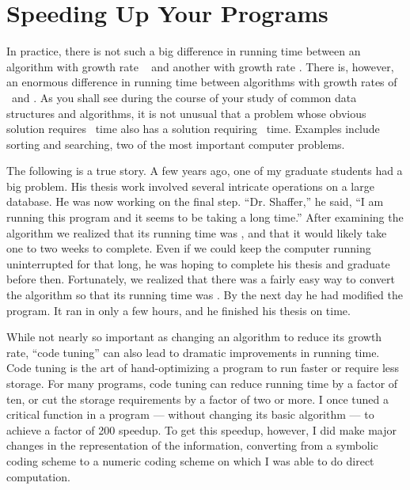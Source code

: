 \section{Speeding Up Your Programs}
\label{CodeTune}

In practice, there is not such a big difference in running time
between an algorithm with growth rate
\Thetan\  and another with
growth rate \Thetanlogn.
There is, however, an enormous difference in running time between
algorithms with growth rates of \Thetanlogn\ and \Thetantwo.
As you shall see during the course of your study of common data
structures and algorithms, it is not unusual that a problem
whose obvious solution requires \Thetantwo\ time also has a solution
requiring \Thetanlogn\ time.
Examples include sorting and
searching, two of the most important computer problems.

\begin{example}
\label{Mahesh}
The following is a true story.
A few years ago, one of my graduate students had a big problem.
His thesis work involved several intricate operations on a large
database.
He was now working on the final step.
``Dr. Shaffer,'' he said, ``I am running this program and it seems to
be taking a long time.''
After examining the algorithm we realized that its running time was
\Thetantwo{}, and that it would likely take
one to two weeks to complete.
Even if we could keep the computer running uninterrupted for that
long, he was hoping to complete his thesis and graduate before then.
Fortunately, we realized that there was a fairly easy way to convert
the algorithm so that its running time was \Thetanlogn.
By the next day he had modified the program.
It ran in only a few hours, and he finished his thesis on time.
\end{example}

While not nearly so important as changing an algorithm to reduce
its growth rate, ``code tuning'' can also lead to dramatic
improvements in running time.
Code tuning is the art of hand-optimizing a program to run faster
or require less storage.
For many programs, code tuning can reduce running time by a factor of
ten, or cut the storage requirements by a factor of two or more.
I once tuned a critical function in a program --- without changing its
basic algorithm --- to achieve a factor of 200 speedup.
To get this speedup, however, I did make major changes in the
representation of the information, converting from a symbolic coding
scheme to a numeric coding scheme on which I was able to do direct
computation.

